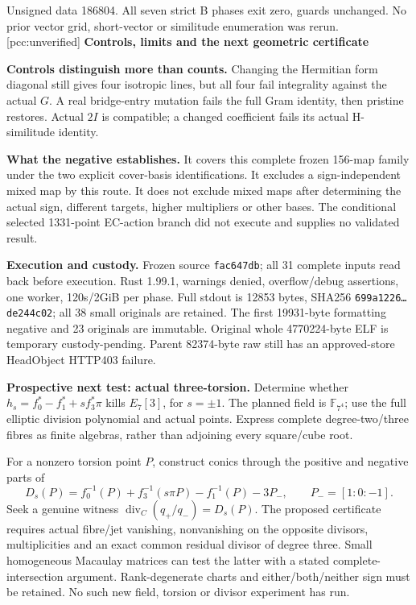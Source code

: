 \documentclass[10pt,a4paper]{article}
\begin{document}
Unsigned data 186804. All seven strict B phases exit zero, guards unchanged.
No prior vector grid, short-vector or similitude enumeration was rerun.
[pcc:unverified]
\newpage
{\Large\bfseries Controls, limits and the next geometric certificate}\par

\textbf{Controls distinguish more than counts.} Changing the Hermitian
form diagonal still gives four isotropic lines, but all four fail
integrality against the actual $G$. A real bridge-entry mutation fails
the full Gram identity, then pristine restores. Actual $2I$ is compatible;
a changed coefficient fails its actual H-similitude identity.

\textbf{What the negative establishes.} It covers this complete frozen
156-map family under the two explicit cover-basis identifications.
It excludes a sign-independent mixed map by this route. It does not
exclude mixed maps after determining the actual sign, different targets,
higher multipliers or other bases. The conditional selected 1331-point
EC-action branch did not execute and supplies no validated result.

\textbf{Execution and custody.} Frozen source
\texttt{fac647db}; all 31 complete inputs read back before execution.
Rust 1.99.1, warnings denied, overflow/debug assertions, one worker,
120s/2GiB per phase. Full stdout is 12853 bytes, SHA256
\texttt{699a1226\ldots de244c02}; all 38 small originals are retained.
The first 19931-byte formatting negative and 23 originals are immutable.
Original whole 4770224-byte ELF is temporary custody-pending. Parent
82374-byte raw still has an approved-store HeadObject HTTP403 failure.

\textbf{Prospective next test: actual three-torsion.} Determine whether
$h_s=f_0^*-f_1^*+s f_3^*\pi$ kills $E_7[3]$, for $s=\pm1$.
The planned field is $\mathbb F_{7^4}$; use the full elliptic division
polynomial and actual points. Express complete degree-two/three fibres
as finite algebras, rather than adjoining every square/cube root.

For a nonzero torsion point $P$, construct conics through the positive
and negative parts of
\[
 D_s(P)=f_0^{-1}(P)+f_3^{-1}(s\pi P)-f_1^{-1}(P)-3P_-,
 \qquad P_-=[1:0:-1].
\]
Seek a genuine witness $\operatorname{div}_C(q_+/q_-)=D_s(P)$.
The proposed certificate requires actual fibre/jet vanishing,
nonvanishing on the opposite divisors, multiplicities and an exact
common residual divisor of degree three. Small homogeneous Macaulay
matrices can test the latter with a stated complete-intersection
argument. Rank-degenerate charts and either/both/neither sign must be
retained. No such new field, torsion or divisor experiment has run.
\end{document}
